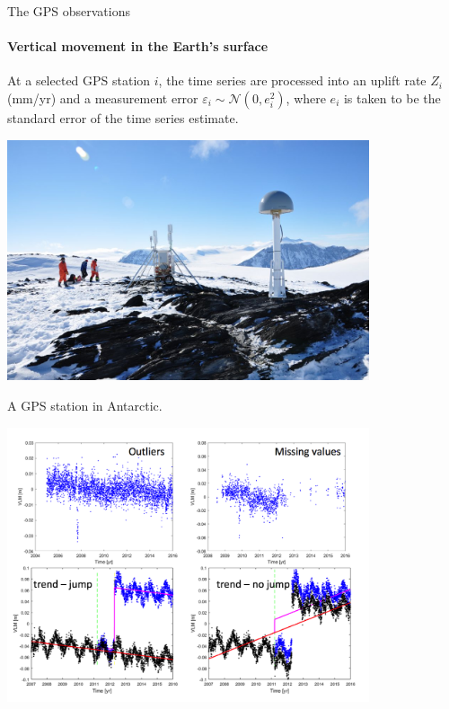 \documentclass{beamer}
\begin{document}
\begin{frame}{The GPS observations}
\framesubtitle{Vertical movement in the Earth's surface}
\vspace{0.3cm}
At a selected GPS station $i$, the time series are processed into an uplift rate $Z_i$ (mm/yr) and a measurement error  $\varepsilon_i \sim \mathcal{N}(0, e_i^2)$, where $e_i$ is taken to be the standard error of the time series estimate.

\begin{minipage}[c]{0.4\textwidth}
\centering
\includegraphics[width=0.8\textwidth]{images/GPSstation}

\tiny{A GPS station in Antarctic.}
\end{minipage}%
\hfill
\begin{minipage}[c]{0.6\textwidth}
\centering
\includegraphics[width=0.8\textwidth]{images/GPSts}
\end{minipage}


\end{frame}
\end{document}
